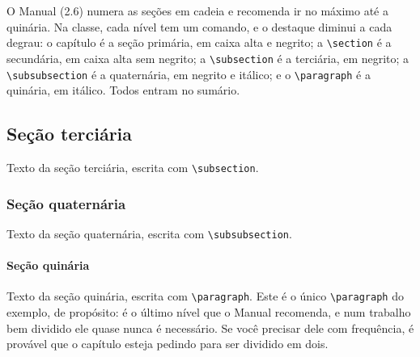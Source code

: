 \documentclass[dsc,pdfa,setavermelha]{ufrj}
\theoremstyle{plain}
\theoremstyle{definition}
\theoremstyle{remark}
\begin{document}
O Manual (2.6) numera as seções em cadeia e recomenda ir no máximo até a quinária. Na classe, cada nível tem um comando, e o destaque diminui a cada degrau: o capítulo é a seção primária, em caixa alta e negrito; a \verb|\section| é a secundária, em caixa alta sem negrito; a \verb|\subsection| é a terciária, em negrito; a \verb|\subsubsection| é a quaternária, em negrito e itálico; e o \verb|\paragraph| é a quinária, em itálico. Todos entram no sumário.

\subsection{Seção terciária}

Texto da seção terciária, escrita com \verb|\subsection|.

\subsubsection{Seção quaternária}

Texto da seção quaternária, escrita com \verb|\subsubsection|.

\paragraph{Seção quinária}

Texto da seção quinária, escrita com \verb|\paragraph|. Este é o único \verb|\paragraph| do exemplo, de propósito: é o último nível que o Manual recomenda, e num trabalho bem dividido ele quase nunca é necessário. Se você precisar dele com frequência, é provável que o capítulo esteja pedindo para ser dividido em dois.
\end{document}

